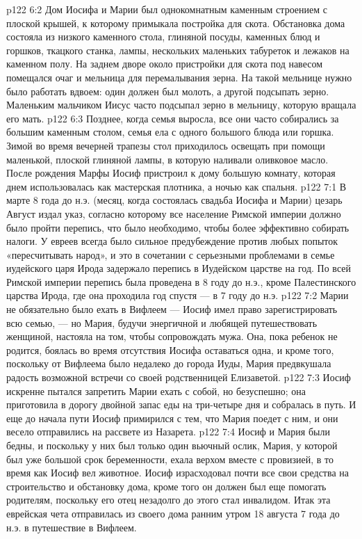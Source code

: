 \vs p122 6:2 Дом Иосифа и Марии был однокомнатным каменным строением с плоской крышей, к которому примыкала постройка для скота. Обстановка дома состояла из низкого каменного стола, глиняной посуды, каменных блюд и горшков, ткацкого станка, лампы, нескольких маленьких табуреток и лежаков на каменном полу. На заднем дворе около пристройки для скота под навесом помещался очаг и мельница для перемалывания зерна. На такой мельнице нужно было работать вдвоем: один должен был молоть, а другой подсыпать зерно. Маленьким мальчиком Иисус часто подсыпал зерно в мельницу, которую вращала его мать.
\vs p122 6:3 Позднее, когда семья выросла, все они часто собирались за большим каменным столом, семья ела с одного большого блюда или горшка. Зимой во время вечерней трапезы стол приходилось освещать при помощи маленькой, плоской глиняной лампы, в которую наливали оливковое масло. После рождения Марфы Иосиф пристроил к дому большую комнату, которая днем использовалась как мастерская плотника, а ночью как спальня.
\vs p122 7:1 В марте 8 года до н.э. (месяц, когда состоялась свадьба Иосифа и Марии) цезарь Август издал указ, согласно которому все население Римской империи должно было пройти перепись, что было необходимо, чтобы более эффективно собирать налоги. У евреев всегда было сильное предубеждение против любых попыток «пересчитывать народ», и это в сочетании с серьезными проблемами в семье иудейского царя Ирода задержало перепись в Иудейском царстве на год. По всей Римской империи перепись была проведена в 8 году до н.э., кроме Палестинского царства Ирода, где она проходила год спустя --- в 7 году до н.э.
\vs p122 7:2 Марии не обязательно было ехать в Вифлеем --- Иосиф имел право зарегистрировать всю семью, --- но Мария, будучи энергичной и любящей путешествовать женщиной, настояла на том, чтобы сопровождать мужа. Она, пока ребенок не родится, боялась во время отсутствия Иосифа оставаться одна, и кроме того, поскольку от Вифлеема было недалеко до города Иуды, Мария предвкушала радость возможной встречи со своей родственницей Елизаветой.
\vs p122 7:3 Иосиф искренне пытался запретить Марии ехать с собой, но безуспешно; она приготовила в дорогу двойной запас еды на три\hyp{}четыре дня и собралась в путь. И еще до начала пути Иосиф примирился с тем, что Мария поедет с ним, и они весело отправились на рассвете из Назарета.
\vs p122 7:4 Иосиф и Мария были бедны, и поскольку у них был только один вьючный ослик, Мария, у которой был уже большой срок беременности, ехала верхом вместе с провизией, в то время как Иосиф вел животное. Иосиф израсходовал почти все свои средства на строительство и обстановку дома, кроме того он должен был еще помогать родителям, поскольку его отец незадолго до этого стал инвалидом. Итак эта еврейская чета отправилась из своего дома ранним утром 18 августа 7 года до н.э. в путешествие в Вифлеем.
